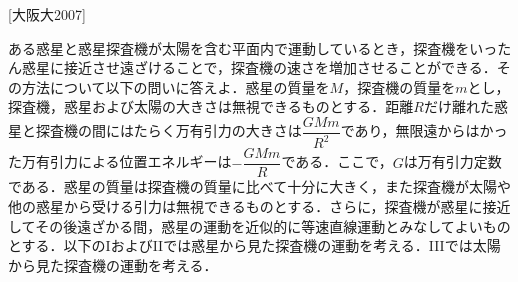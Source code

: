 


\noindent
{} [大阪大2007]

ある惑星と惑星探査機が太陽を含む平面内で運動しているとき，探査機をいったん惑星に接近させ遠ざけることで，探査機の速さを増加させることができる．その方法について以下の問いに答えよ．惑星の質量を$M$，探査機の質量を$m$とし，探査機，惑星および太陽の大きさは無視できるものとする．距離$R$だけ離れた惑星と探査機の間にはたらく万有引力の大きさは$\dfrac{GMm}{R^2}$であり，無限遠からはかった万有引力による位置エネルギーは$-\dfrac{GMm}{R}$である．ここで，$G$は万有引力定数である．惑星の質量は探査機の質量に比べて十分に大きく，また探査機が太陽や他の惑星から受ける引力は無視できるものとする．さらに，探査機が惑星に接近してその後遠ざかる間，惑星の運動を近似的に等速直線運動とみなしてよいものとする．以下のIおよびIIでは惑星から見た探査機の運動を考える．IIIでは太陽から見た探査機の運動を考える．
